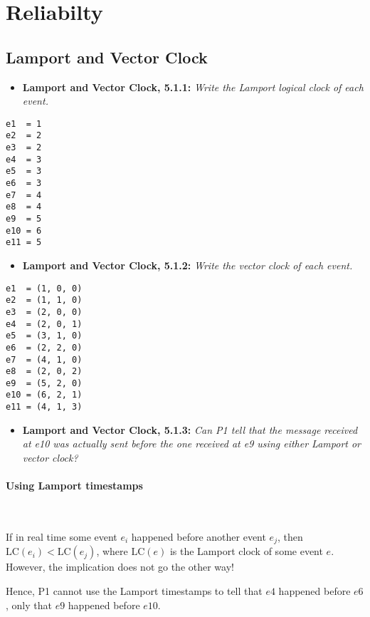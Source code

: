 
\newpage
\section{Reliabilty}

\subsection{Lamport and Vector Clock}

\begin{itemize}
  \item \textbf{Lamport and Vector Clock, 5.1.1:}
        \textit{Write the Lamport logical clock of each event.}
\end{itemize}

\begin{verbatim}
e1  = 1
e2  = 2
e3  = 2
e4  = 3
e5  = 3
e6  = 3
e7  = 4
e8  = 4
e9  = 5
e10 = 6
e11 = 5
\end{verbatim}


\begin{itemize}
  \item \textbf{Lamport and Vector Clock, 5.1.2:}
        \textit{Write the vector clock of each event.}
\end{itemize}

\begin{verbatim}
e1  = (1, 0, 0)
e2  = (1, 1, 0)
e3  = (2, 0, 0)
e4  = (2, 0, 1)
e5  = (3, 1, 0)
e6  = (2, 2, 0)
e7  = (4, 1, 0)
e8  = (2, 0, 2)
e9  = (5, 2, 0)
e10 = (6, 2, 1)
e11 = (4, 1, 3)
\end{verbatim}


\begin{itemize}
  \item \textbf{Lamport and Vector Clock, 5.1.3:}
        \textit{Can P1 tell that the message received at e10 was actually sent
        before the one received at e9 using either Lamport or vector clock?}
\end{itemize}


\paragraph{Using Lamport timestamps}~\smallskip

If in real time some event $e_i$ happened before another event $e_j$, then
$\text{LC}(e_i) < \text{LC}(e_j)$, where $\text{LC}(e)$ is the Lamport clock of
some event $e$. However, the implication does not go the other way!
\smallskip

Hence, P1 cannot use the Lamport timestamps to tell that $e4$ happened before
$e6$, only that $e9$ happened before $e10$.


